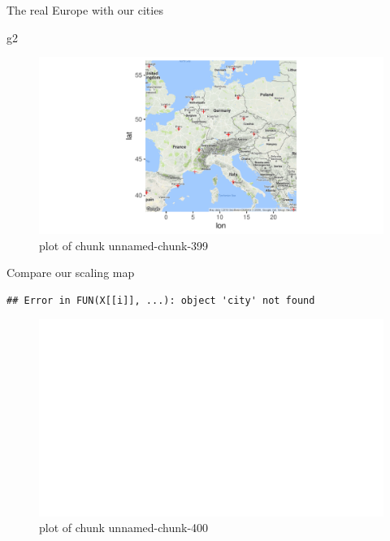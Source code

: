 \documentclass[ignorenonframetext,]{beamer}
\newenvironment{Shaded}{\begin{snugshade}}{\end{snugshade}}
\newcommand{\NormalTok}[1]{#1}
\begin{document}
\begin{frame}[fragile]{The real Europe with our cities}
\protect\hypertarget{the-real-europe-with-our-cities}{}

\begin{Shaded}
\begin{Highlighting}[]
\NormalTok{g2}
\end{Highlighting}
\end{Shaded}

\begin{figure}
\centering
\includegraphics{figure/unnamed-chunk-399-1.pdf}
\caption{plot of chunk unnamed-chunk-399}
\end{figure}

\end{frame}

\begin{frame}[fragile]{Compare our scaling map}
\protect\hypertarget{compare-our-scaling-map}{}

\begin{verbatim}
## Error in FUN(X[[i]], ...): object 'city' not found
\end{verbatim}

\begin{figure}
\centering
\includegraphics{figure/unnamed-chunk-400-1.pdf}
\caption{plot of chunk unnamed-chunk-400}
\end{figure}

\end{frame}
\end{document}

